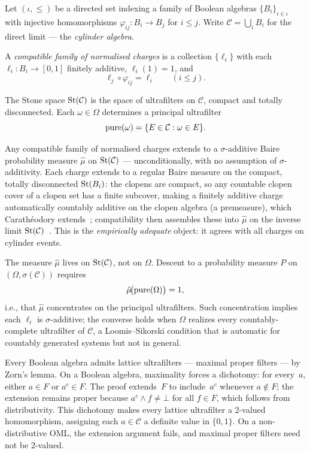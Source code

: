 Let $(\iota, \leq)$ be a directed set indexing a family of Boolean
algebras $\{B_i\}_{i \in \iota}$ with injective homomorphisms
$\varphi_{ij} : B_i \to B_j$ for $i \leq j$.  Write
$\mathcal{C} = \bigcup_i B_i$ for the direct limit --- the
\emph{cylinder algebra}.

A \emph{compatible family of normalised charges} is a collection
$\{\ell_i\}$ with each $\ell_i : B_i \to [0,1]$ finitely additive,
$\ell_i(1) = 1$, and
\[
  \ell_j \circ \varphi_{ij} = \ell_i
  \qquad (i \leq j).
\]

The Stone space $\mathrm{St}(\mathcal{C})$ is the space of ultrafilters on
$\mathcal{C}$, compact and totally disconnected.  Each
$\omega \in \Omega$ determines a principal ultrafilter
\[
  \mathrm{pure}(\omega) = \{E \in \mathcal{C} : \omega \in E\}.
\]

Any compatible family of normalised charges extends to a
$\sigma$-additive Baire probability measure $\hat{\mu}$ on
$\mathrm{St}(\mathcal{C})$ --- unconditionally, with no assumption of
$\sigma$-additivity.  Each charge extends to a regular Baire measure on
the compact, totally disconnected $\mathrm{St}(B_i)$: the clopens are compact,
so any countable clopen cover of a clopen set has a finite subcover,
making a finitely additive charge automatically countably additive on
the clopen algebra (a premeasure), which Carath\'{e}odory
extends~\cite{rao1983, Halmos1950}; compatibility then
assembles these into $\hat{\mu}$ on the inverse limit
$\mathrm{St}(\mathcal{C})$~\cite[Theorem~1]{choksi1958}.  This is the
\emph{empirically adequate} object: it agrees with all charges on
cylinder events.

The measure $\hat{\mu}$ lives on $\mathrm{St}(\mathcal{C})$, not on
$\Omega$.  Descent to a probability measure $P$ on
$(\Omega, \sigma(\mathcal{C}))$ requires
\[
  \hat{\mu}\!\bigl(\mathrm{pure}(\Omega)\bigr) = 1,
\]
i.e., that $\hat{\mu}$ concentrates on the principal ultrafilters.
Such concentration implies each $\ell_i$ is $\sigma$-additive; the
converse holds when $\Omega$ realizes every countably-complete
ultrafilter of $\mathcal{C}$, a Loomis--Sikorski condition that is
automatic for countably generated systems but not in general.

Every Boolean algebra admits lattice ultrafilters --- maximal proper
filters --- by Zorn's lemma.  On a Boolean algebra, maximality
forces a dichotomy: for every~$a$, either $a \in F$ or
$a^c \in F$.  The proof extends~$F$ to include~$a^c$ whenever
$a \notin F$; the extension remains proper because
$a^c \wedge f \neq \bot$ for all $f \in F$, which follows from
distributivity.  This dichotomy makes every lattice ultrafilter a
2-valued homomorphism, assigning each $a \in \mathcal{C}$ a definite
value in $\{0, 1\}$.  On a non-distributive OML, the extension
argument fails, and maximal proper filters need not be 2-valued.

